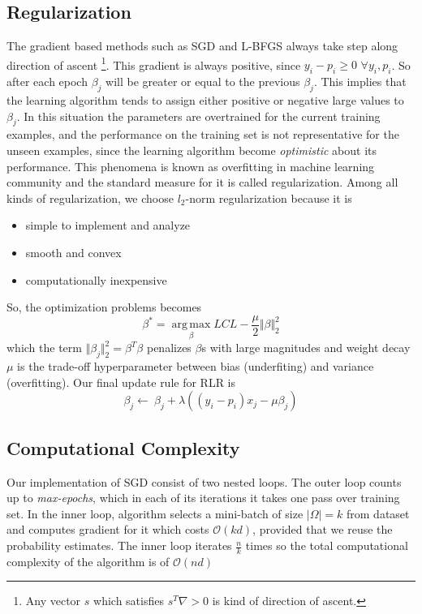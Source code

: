 \documentclass[twoside,12pt]{article}
\begin{document}
\subsection{Regularization}
The gradient based methods such as SGD and L-BFGS always take step along direction of ascent \footnote{Any vector $s$ which satisfies $s^T\nabla>0$ is kind of direction of ascent.}. This gradient is always positive, since $y_i-p_i \geq 0$ $\forall y_i, p_i$. So after each epoch $\beta_j$ will be greater or equal to the previous $\beta_j$. This implies that the learning algorithm tends to assign either positive or negative large values to $\beta_j$. In this situation the parameters are overtrained for the current training examples, and the performance on the training set is not representative for the unseen examples, since the learning algorithm become \emph{optimistic} about its performance. This phenomena is known as overfitting in machine learning community and the standard measure for it is called regularization. Among all kinds of regularization, we choose $l_2$-norm  regularization because it is
\begin{itemize}
	\item simple to implement and analyze
	\item smooth and convex
	\item computationally inexpensive
\end{itemize}
So, the optimization problems becomes
\begin{equation}
\beta^* = \operatorname*{arg\,max}_{\beta}{LCL - \frac{\mu}{2}\Vert \beta \Vert^2_2}
\end{equation}
which the term $\Vert\beta_j\Vert^2_2=\beta^T\beta$ penalizes $\beta$s with large magnitudes and weight decay $\mu$ is the trade-off hyperparameter between bias (underfiting) and variance (overfitting). Our final update rule for RLR is
\begin{equation}
\beta_j \leftarrow \ \beta_j+\lambda\left((y_i-p_i)x_j-\mu\beta_j\right)
\end{equation}

\subsection{Computational Complexity}
Our implementation of SGD consist of two nested loops. The outer loop counts up to \emph{max-epochs}, which in each of its iterations it takes one pass over training set.
In the inner loop, algorithm selects a mini-batch of size $|\Omega|=k$ from dataset and computes gradient for it which costs $\mathcal{O}(kd)$, provided that we reuse the probability estimates. The inner loop iterates $\frac{n}{k}$ times so the total computational complexity of the algorithm is of $\mathcal{O}(nd)$
\end{document}
